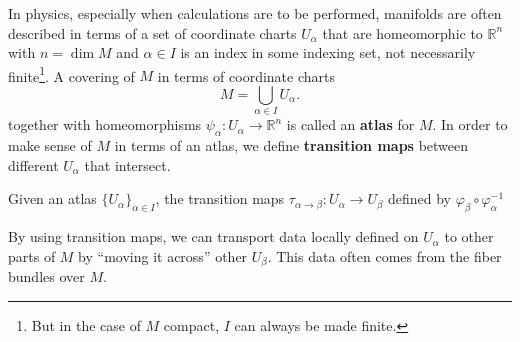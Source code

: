 	
	In physics, especially when calculations are to be performed, manifolds are often described in terms of a set of coordinate charts $U_\alpha$ that are homeomorphic to $\mathbb R^n$ with $n = \dim M$ and $\alpha \in I$ is an index in some indexing set, not necessarily finite\footnote{But in the case of $M$ compact, $I$ can always be made finite.}. A covering of $M$ in terms of coordinate charts 
	\[
		M = \bigcup_{\alpha \in I} U_\alpha.
	\]
	together with homeomorphisms $\psi_\alpha: U_\alpha \to \mathbb R^n$ is called an \textbf{atlas} for $M$. In order to make sense of $M$ in terms of an atlas, we define \textbf{transition maps} between different $U_\alpha$ that intersect.
	\begin{defn}
		Given an atlas $\{U_{\alpha}\}_{\alpha \in I}$, the transition maps $\tau_{\alpha \to \beta}: U_\alpha \to U_\beta$ defined by $\varphi_\beta \circ \varphi_{\alpha}^{-1}$
	\end{defn} 
	By using transition maps, we can transport data locally defined on $U_{\alpha}$ to other parts of $M$ by ``moving it across'' other $U_\beta$. This data often comes from the fiber bundles over $M$.
	
